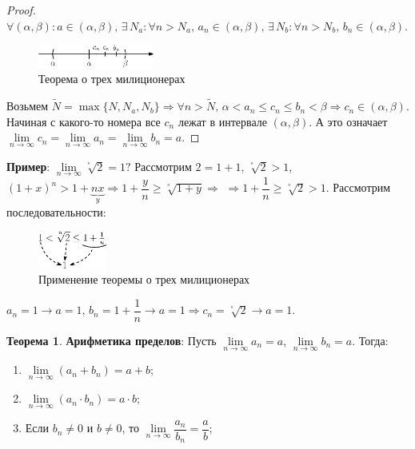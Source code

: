 \documentclass[12pt]{article}
\theoremstyle{definition}
\newtheorem{theorem}{Теорема}
\begin{document}
\begin{proof}
$\forall (\alpha, \beta) \colon a \in (\alpha, \beta), \, \exists \, N_a \colon \forall n > N_a, \, a_n \in (\alpha,\beta), \, \exists \, N_b \colon \forall n > N_b, \, b_n \in (\alpha,\beta).$
	\begin{figure}[H]
		\centering
		\includegraphics[width=0.34\textwidth]{8_8.eps}
		\caption{Теорема о трех милиционерах}
		\label{fig:8_8}
	\end{figure}
Возьмем $\tilde{N} = \max\{N, N_a, N_b\} \Rightarrow \forall n > \tilde{N}, \, \alpha < a_n \leq c_n \leq b_n < \beta \Rightarrow c_n \in (\alpha,\beta)$. Начиная с какого-то номера все $c_n$ лежат в интервале $(\alpha, \beta)$. А это означает  $\lim\limits_{n \rightarrow \infty}{c_n} = \lim\limits_{n \rightarrow \infty}{a_n} = \lim\limits_{n \rightarrow \infty}{b_n} = a$.
\end{proof}

\textbf{Пример}: $\lim\limits_{n \rightarrow \infty}{\sqrt[^n]{2}} = 1 ?$ Рассмотрим $2 = 1 + 1$, $\sqrt[^n]{2} > 1$, $(1+x)^n > 1+\underbrace{nx}_{y} \Rightarrow 1 + \dfrac{y}{n} \geq \sqrt[^n]{1+y} \Rightarrow$ 
$\Rightarrow 1+\dfrac{1}{n} \geq \sqrt[^n]{2} > 1$. Рассмотрим последовательности:
	
\begin{figure}[H]
	\centering
	\includegraphics[width=0.2\textwidth]{8_9.eps}
	\caption{Применение теоремы о трех милиционерах}
	\label{fig:8_9}
\end{figure}
	
$a_n = 1 \rightarrow a = 1, \, b_n = 1 + \dfrac{1}{n} \rightarrow a = 1 \Rightarrow c_n = \sqrt[^n]{2} \rightarrow a = 1 $.
	
\begin{theorem}\textbf{Арифметика пределов}:
	Пусть  $\lim\limits_{n \rightarrow \infty}{a_n} = a$, $\lim\limits_{n \rightarrow \infty}{b_n} = a$. Тогда:
	\begin{enumerate}[label={\arabic*)}]
		\item  $\lim\limits_{n \rightarrow \infty}(a_n + b_n) = a + b$;
		\item $\lim\limits_{n \rightarrow \infty}(a_n \cdot b_n) = a \cdot b$;
		\item Если $b_n \neq 0$ и $b \neq 0$, то $\lim\limits_{n \rightarrow \infty}\dfrac{a_n}{b_n} = \dfrac{a}{b}$;
	\end{enumerate}
\end{theorem}
\end{document}
